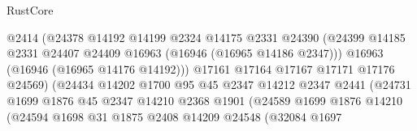 \begin{lexlean}{RustCore}
\begin{coremodule}
                                        @2414
                                        (@24378
                                          @14192
                                          @14199
                                          @2324
                                          @14175
                                          @2331
                                          @24390
                                          (@24399
                                            @14185
                                            @2331
                                            @24407
                                            @24409
                                            @16963
                                            (@16946 (@16965 @14186 @2347)))
                                          @16963
                                          (@16946 (@16965 @14176 @14192)))
                                        @17161
                                        @17164
                                        @17167
                                        @17171
                                        @17176
                                        @24569)
                                      (@24434
                                        @14202
                                        @1700
                                        @95
                                        @45
                                        @2347
                                        @14212
                                        @2347
                                        @2441
                                        (@24731
                                          @1699
                                          @1876
                                          @45
                                          @2347
                                          @14210
                                          @2368
                                          @1901
                                          (@24589
                                            @1699
                                            @1876
                                            @14210
                                            (@24594
                                              @1698
                                              @31
                                              @1875
                                              @2408
                                              @14209
                                              @24548
                                              (@32084
                                                @1697

\end{coremodule}
\end{lexlean}
